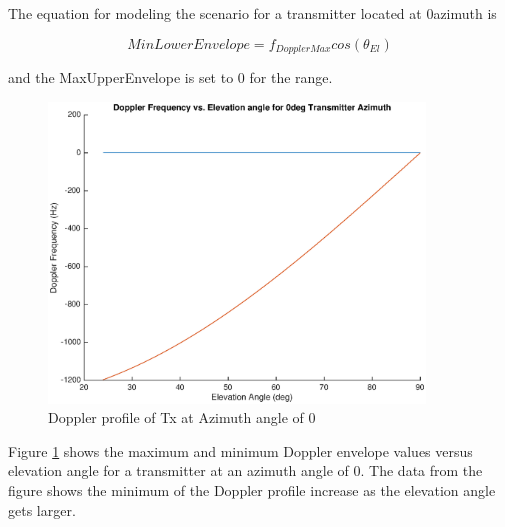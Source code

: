 The equation for modeling the scenario for a transmitter located at 0\textdegree \space azimuth is

\begin{equation}
	MinLowerEnvelope = f_{DopplerMax}cos(\theta_{El})
	\label{eq:theory_0_lower}
\end{equation}

and the MaxUpperEnvelope is set to 0 for the range.

\begin{figure}
	\begin{center}
		\includegraphics[width=10cm]{images/background/3d_geometry_tx_0az_doppler_profile.eps}
		\caption{Doppler profile of Tx at Azimuth angle of 0\textdegree}
		\label{fig:3D_model_0az_doppler}
	\end{center}
\end{figure}

Figure \ref{fig:3D_model_0az_doppler} shows the maximum and minimum Doppler envelope values versus elevation angle for a transmitter at an azimuth angle of 0\textdegree. The data from the figure shows the minimum of the Doppler profile increase as the elevation angle gets larger.
